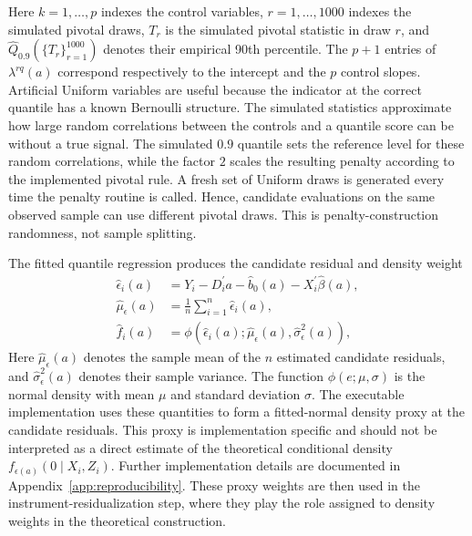 Here $k=1,\ldots,p$ indexes the control variables, $r=1,\ldots,1000$ indexes the simulated pivotal draws, $T_r$ is the simulated pivotal statistic in draw $r$, and $\widehat Q_{0.9}(\{T_r\}_{r=1}^{1000})$ denotes their empirical 90th percentile. The $p+1$ entries of $\lambda^{rq}(a)$ correspond respectively to the intercept and the $p$ control slopes. Artificial Uniform variables are useful because the indicator at the correct quantile has a known Bernoulli structure. The simulated statistics approximate how large random correlations between the controls and a quantile score can be without a true signal. The simulated $0.9$ quantile sets the reference level for these random correlations, while the factor $2$ scales the resulting penalty according to the implemented pivotal rule. A fresh set of Uniform draws is generated every time the penalty routine is called. Hence, candidate evaluations on the same observed sample can use different pivotal draws. This is penalty-construction randomness, not sample splitting.

The fitted quantile regression produces the candidate residual and density weight
\begin{equation}
    \begin{aligned}
        \widehat{\epsilon}_i(a)
        &=
        Y_i-D_i^{\prime}a-\widehat b_0(a)
        -X_i^{\prime}\widehat{\beta}(a),\\
        \widehat{\mu}_{\epsilon}(a)
        &=\frac{1}{n}\sum_{i=1}^{n}\widehat{\epsilon}_i(a),\\
        \widehat f_i(a)
        &=
        \phi\!\left(
            \widehat{\epsilon}_i(a);
            \widehat{\mu}_{\epsilon}(a),
            \widehat{\sigma}_{\epsilon}^{2}(a)
        \right),
    \end{aligned}
    \label{eq:estimated-profile-residual}
\end{equation}
Here $\widehat{\mu}_{\epsilon}(a)$ denotes the sample mean of the $n$ estimated candidate residuals, and $\widehat{\sigma}_{\epsilon}^{2}(a)$ denotes their sample variance. The function $\phi(e;\mu,\sigma)$ is the normal density with mean $\mu$ and standard deviation $\sigma$. The executable implementation uses these quantities to form a fitted-normal density proxy at the candidate residuals. This proxy is implementation specific and should not be interpreted as a direct estimate of the theoretical conditional density $f_{\epsilon(a)}(0\mid X_i,Z_i)$. Further implementation details are documented in Appendix~\ref{app:reproducibility}. These proxy weights are then used in the instrument-residualization step, where they play the role assigned to density weights in the theoretical construction.


